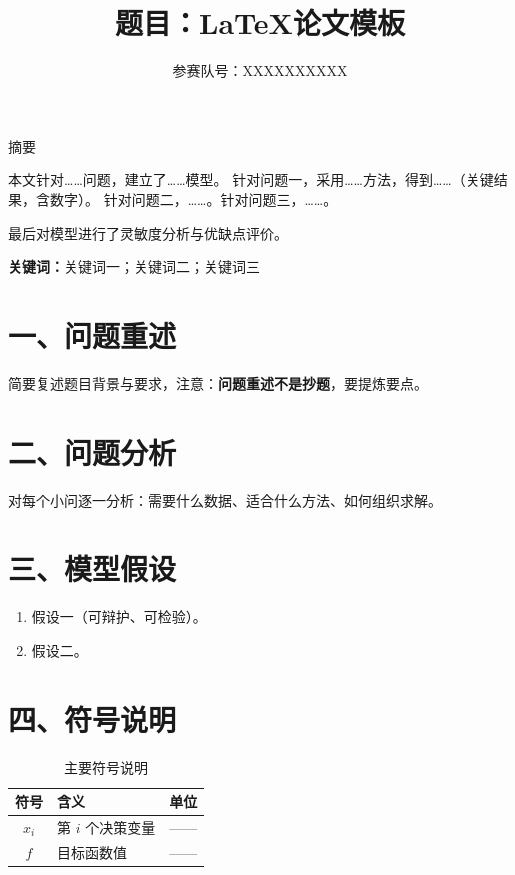 \documentclass[12pt]{ctexart}
\title{\textbf{题目：\LaTeX 论文模板}}
\author{参赛队号：XXXXXXXXXX}
\date{}
\begin{document}
\maketitle

\begin{center}
{\Large\heiti 摘\quad 要}
\end{center}

本文针对\ldots\ldots 问题，建立了\ldots\ldots 模型。
针对问题一，采用\ldots\ldots 方法，得到\ldots\ldots（关键结果，含数字）。
针对问题二，\ldots\ldots。针对问题三，\ldots\ldots。

最后对模型进行了灵敏度分析与优缺点评价。

\noindent\textbf{关键词：}关键词一；关键词二；关键词三

\clearpage

\section*{一、问题重述}

简要复述题目背景与要求，注意：\textbf{问题重述不是抄题}，要提炼要点。

\section*{二、问题分析}

对每个小问逐一分析：需要什么数据、适合什么方法、如何组织求解。

\section*{三、模型假设}

\begin{enumerate}
  \item 假设一（可辩护、可检验）。
  \item 假设二。
\end{enumerate}

\section*{四、符号说明}

\begin{table}[H]
\centering
\caption{主要符号说明}
\begin{tabular}{clc}
\toprule
符号 & 含义 & 单位 \\
\midrule
$x_i$ & 第 $i$ 个决策变量 & —— \\
$f$   & 目标函数值 & —— \\
\bottomrule
\end{tabular}
\end{table}
\end{document}
